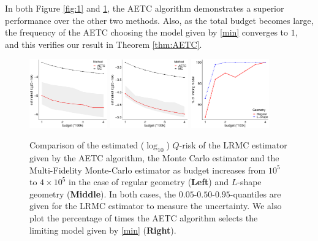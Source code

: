 \documentclass[a4paper,11pt]{article}
\numberwithin{equation}{section}
\theoremstyle{plain}
\theoremstyle{definition}
\begin{document}
In both Figure \ref{fig:1} and \ref{fig:11}, the AETC algorithm demonstrates a superior performance over the other two methods. Also, as the total budget becomes large, the frequency of the AETC choosing the model given by \eqref{min} converges to $1$, and this verifies our result in Theorem \ref{thm:AETC}. 

\begin{figure}[h!]
\begin{center}
\includegraphics[width=0.30\textwidth]{s-r-m.pdf}
\includegraphics[width=0.30\textwidth]{s-r-m_new.pdf}
\includegraphics[width=0.30\textwidth]{model_m.pdf}
\caption{\small Comparison of the estimated ($\log_{10}$) $Q$-risk of the LRMC estimator given by the AETC algorithm, the Monte Carlo estimator and the Multi-Fidelity Monte-Carlo estimator as budget increases from $10^5$ to $4\times 10^5$ in the case of regular geometry (\textbf{Left}) and $L$-shape geometry (\textbf{Middle}).  In both cases, the $0.05$-$0.50$-$0.95$-quantiles are given for the LRMC estimator to measure the uncertainty. We also plot the percentage of times the AETC algorithm selects the limiting model given by \eqref{min} (\textbf{Right}).}
  \label{fig:11}
  \end{center}
\end{figure}
\end{document}
